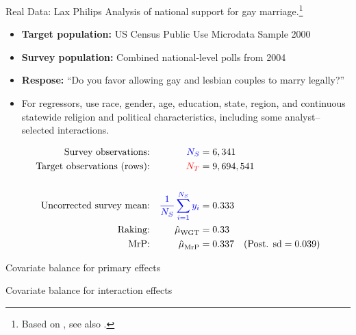 \begin{frame}{Real Data: Lax Philips}
Analysis of national support for gay marriage.\footnote{Based on \textcite{kastellec:2010:laxmrp},
see also \textcite{lax:2009:gay}.}

\begin{itemize}
    \item \textbf{Target population:} US Census Public Use Microdata Sample 2000
    \item \textbf{Survey population:} Combined national-level polls from 2004
    \item \textbf{Respose:}  ``Do you favor allowing gay and lesbian couples to marry legally?''
    \item For regressors, use race, gender, age, education, state, region,
        and continuous statewide religion and political characteristics, including
        some analyst--selected interactions.
\end{itemize}

$$
\begin{aligned}
    \textrm{Survey observations:} &&  \textcolor{blue}{{\textcolor{blue}{N_S}}} ={}& 6,341  \\
    \textrm{Target observations (rows):} &&  \textcolor{red}{{\textcolor{red}{N_T}}} ={}& 9,694,541 \\
    \\
    \textrm{Uncorrected survey mean:} && \textcolor{blue}{\frac{1}{{\textcolor{blue}{N_S}}} \sum_{i=1}^{\textcolor{blue}{N_S}} y_i} ={}& 0.333 \\
    \textrm{Raking:} && \hat{\mu}^{}_{\mathrm{WGT}} ={}& 0.33 \\
    \textrm{MrP:} && \hat{\mu}^{}_{\mathrm{MrP}} ={}& 0.337
        \quad(\textrm{Post. sd} = 0.039)\\
\end{aligned}
$$
%
\end{frame}






\begin{frame}{Covariate balance for primary effects}
\LaxImbalancePrimary{}
\end{frame}


\begin{frame}{Covariate balance for interaction effects}
\LaxImbalanceInteraction{}
\end{frame}




